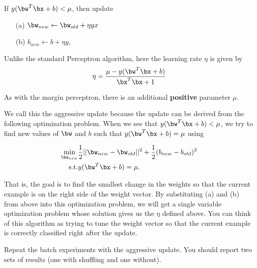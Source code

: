 \begin{enumerate}
  If $y (\bw^T\bx + b) < \mu$, then update
  \begin{itemize}
  \item[(a)] $\bw_{new} \leftarrow \bw_{old} + \eta yx$
  \item[(b)] $b_{new} \leftarrow b + \eta y$,
  \end{itemize}
  Unlike the standard Perceptron algorithm, here the learning rate
  $\eta$ is given by
  $$\eta = \frac{\mu - y(\bw^T\bx + b)}{\bx^T\bx + 1}$$
  
  As with the margin perceptron, there is an additional {\bf positive}
  parameter $\mu$. 

  We call this the aggressive update because the update can be derived
  from the following optimization problem. When we see that
  $y(\bw^T\bx +b) < \mu$, we try to find new values of $\bw$ and $b$
  such that $y(\bw^T\bx +b) = \mu$ using 

  \begin{eqnarray*}
    \min_{\bw_{new}} & \frac{1}{2} ||\bw_{new} - \bw_{old}||^2 +\frac{1}{2}(b_{new} - b_{old})^2 \\
      \mbox{s.t.} & y(\bw^T\bx +b) = \mu.
  \end{eqnarray*}

  That is, the goal is to find the smallest change in the weights so
  that the current example is on the right side of the weight vector.
  By substituting (a) and (b) from above into this optimization
  problem, we will get a single variable optimization problem whose
  solution gives us the $\eta$ defined above. You can think of this
  algorithm as trying to tune the weight vector so that the current
  example is correctly classified right after the update.

  Repeat the batch experiments with the aggressive update. You should
  report two sets of results (one with shuffling and one without).

\end{enumerate}

